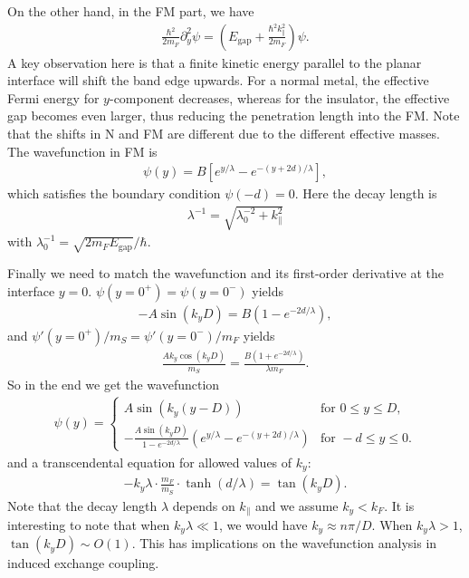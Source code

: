 \documentclass{article}
\begin{document}
On the other hand, in the FM part, we have 
\begin{align}
\frac{\hbar^2}{2m_F}\partial^2_y \psi = \left( E_{\text{gap}} + \frac{\hbar^2 k^2_{\parallel}}{2m_F} \right) \psi.
\end{align}
A key observation here is that a finite kinetic energy parallel to the planar interface will shift the band edge upwards. For a normal metal, the effective Fermi energy for $y$-component decreases, whereas for the insulator, the effective gap becomes even larger, thus reducing the penetration length into the FM. Note that the shifts in N and FM are different due to the different effective masses. The wavefunction in FM is
\begin{align}
\psi(y) = B \left[ e^{y/\lambda} -  e^{-(y+2d)/\lambda}  \right],
\end{align}
which satisfies the boundary condition $\psi(-d) = 0$.
Here the decay length is
\begin{align}
\lambda^{-1} = \sqrt{\lambda^{-2}_0 + k^2_{\parallel} }
\end{align}
with $\lambda^{-1}_0 =   \sqrt{2m_FE_{\text{gap}}} / \hbar$.



Finally we need to match the wavefunction and its first-order derivative at the interface $y=0$. $\psi(y=0^+) = \psi(y=0^-)$ yields
\begin{align}
-A \sin (k_y D) =  B(1 - e^{-2d/\lambda}),
\end{align}
and $\psi'(y=0^+) / m_S = \psi'(y=0^-) / m_F$ yields
\begin{align}
\frac{A  k_y \cos (k_y D)}{m_S} = \frac{B(  1 + e^{-2d/\lambda} )}{\lambda m_F} .
\end{align}
So in the end we get the wavefunction
\begin{align}
\psi(y) = \left\{ 
\begin{array}{ll}  A \sin (k_y(y-D))   & \text{for }  0 \leq y \leq D,\\
  - \frac{A \sin (k_y D)}{1 - e^{-2d/\lambda}} \left( e^{y/\lambda} -  e^{-(y+2d)/\lambda} \right) & \text{for }  -d \leq y \leq 0. 
\end{array}\right.
\end{align}
and a transcendental equation for allowed values of $k_y$: 
\begin{align}
-k_y \lambda \cdot \frac{m_F}{m_S} \cdot  \tanh (d/\lambda) = \tan (k_y D).
\end{align}
Note that the decay length $\lambda$ depends on $k_{\parallel}$ and we assume $k_y < k_F$. It is interesting to note that when $k_y \lambda \ll 1$, we would have $k_y \approx n \pi/D$. When $k_y \lambda >1$, $\tan (k_y D) \sim O(1)$. This has implications on the wavefunction analysis in induced exchange coupling.
\end{document}
